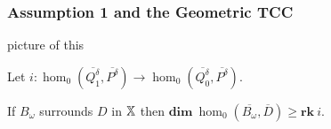 \begin{frame}
  \frametitle{{\small Assumption 1 and the Geometric TCC}}


  {\color{red} picture of this}

  \begin{lemma}\label{lem:psurj}
    Let $i : \hom_0(\overline{Q_1^\delta}, \overline{P^\delta})\to \hom_0(\overline{Q_0^\delta}, \overline{P^\delta})$.

    If $B_\omega$ surrounds $D$ in $\mathbb{X}$ then $\mathbf{dim}~\hom_0(\overline{B_\omega}, \overline{D})\geq \mathbf{rk}~i$.
  \end{lemma}

\end{frame}


